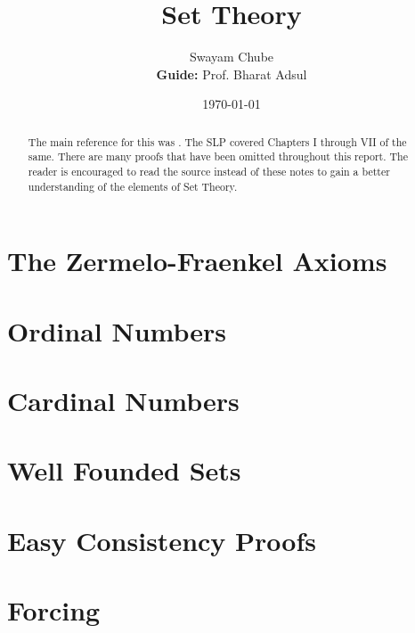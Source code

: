 \documentclass[oneside,a4paper]{report}
\title{Set Theory}
\author{Swayam Chube\\\textbf{Guide:} Prof. Bharat Adsul}
\date{\today}
\begin{document}
\maketitle

\begin{abstract}
    The main reference for this was \cite{kunen}. The SLP covered Chapters I through VII of the same. There are many proofs that have been omitted throughout this report. The reader is encouraged to read the source instead of these notes to gain a better understanding of the elements of Set Theory.
\end{abstract}

\tableofcontents

\chapter{The Zermelo-Fraenkel Axioms}


\chapter{Ordinal Numbers}


\chapter{Cardinal Numbers}


\chapter{Well Founded Sets}


\chapter{Easy Consistency Proofs}


\chapter{Forcing}




\end{document}
